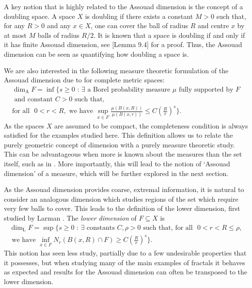 A key notion that is highly related to the Assouad dimension is the concept of a doubling space. A space $X$ is doubling if there exists a constant $M > 0$ such that, for any $R > 0$ and any $x \in X$, one can cover the ball of radius $R$ and centre $x$ by at most $M$ balls of radius $R/2$. It is known that a space is doubling if and only if it has finite Assouad dimension, see \cite{robinson}[Lemma 9.4] for a proof. Thus, the Assouad dimension can be seen as quantifying how doubling a space is.

We are also interested in the following measure theoretic formulation of the Assouad dimension due to \cite{luksak, konyagin} for complete metric spaces: 
\begin{multline*} 
\dim_{\text{A}} F = \inf \Bigg\{ s \geq 0 \, \,  : \, \exists \text{ a Borel probability measure } \mu \text{ fully supported by }F \\  \text{ and constant }C > 0\text{  such that,} \\ \text{for all } \, \, 0< r< R, \text{ we have  }  \sup_{x\in F} \frac{\mu(B(x,R))}{\mu(B(x,r))} \leq C\left(\frac{R}{r}\right)^{s} \Bigg\}.
\end{multline*}
As the spaces $X$ are assumed to be compact, the completeness condition is always satisfied for the examples studied here. This definition allows us to relate the purely geometric concept of dimension with a purely measure theoretic study. This can be advantageous when more is known about the measures than the set itself, such as in \cite{fraser-howroyd1}. More importantly, this will lead to the notion of `Assouad dimension' of a measure, which will be further explored in the next section. 


As the Assouad dimension provides coarse, extremal information, it is natural to consider an analogous dimension which studies regions of the set which require very few balls to cover. This leads to the definition of the lower dimension, first studied by Larman \cite{larman1,larman2}. The \textit{lower dimension} of $F \subseteq X$ is 
\begin{multline*}
\dim_{\text{L}} F = \sup \Bigg\{ s \geq 0 \, \,  : \, \exists \text{ constants }C, \rho > 0 \text{ such that, for all } \, \, 0< r< R \leq \rho,\\ \text{ we have  }\inf_{x\in F} N_r (B(x,R)\cap F) \geq C\left(\frac{R}{r}\right)^{s} \Bigg\}.
\end{multline*}
This notion has seen less study, partially due to a few undesirable properties that it possesses, but when studying many of the main examples of fractals it behaves as expected and results for the Assouad dimension can often be transposed to the lower dimension. 

